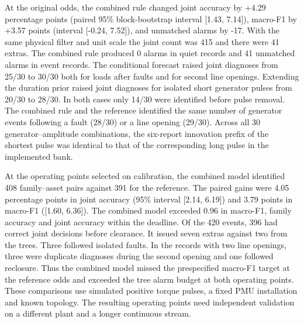 At the original odds, the combined rule changed joint accuracy by +4.29
percentage points (paired 95\% block-bootstrap interval [1.43, 7.14]),
macro-F1 by +3.57 points (interval [-0.24, 7.52]),
and unmatched alarms by -17.
With the same physical filter and unit scale the joint count was 415 and there were 41 extras.
The combined rule produced 0 alarms in quiet records and 41 unmatched alarms in event records.
The conditional forecast raised joint diagnoses from 25/30 to 30/30 both for loads after faults and for second line openings.
Extending the duration prior raised joint diagnoses for isolated short generator pulses from 20/30 to 28/30. In both cases only 14/30 were identified before pulse removal.
The combined rule and the reference identified the same number of generator events following a fault (28/30) or a line opening (29/30).
Across all 30 generator--amplitude combinations, the six-report
innovation prefix of the shortest pulse was identical to that of the corresponding long pulse in the implemented bank.

At the operating points selected on calibration, the combined model identified 408 family--asset pairs against 391 for the reference.
The paired gains were 4.05 percentage points in joint accuracy (95\% interval [2.14, 6.19]) and 3.79 points in macro-F1 ([1.60, 6.36]).
The combined model exceeded 0.96 in macro-F1, family accuracy and joint accuracy within the deadline. Of the 420 events, 396 had correct joint decisions before clearance.
It issued seven extras against two from the trees. Three followed isolated faults. In the records with two line openings, three were duplicate diagnoses during the second opening and one followed reclosure.
Thus the combined model missed the prespecified macro-F1 target at the reference odds and exceeded the tree alarm budget at both operating points.
These comparisons use simulated positive torque pulses, a fixed PMU installation and known topology.
The resulting operating points need independent validation on a different plant and a longer continuous stream.
